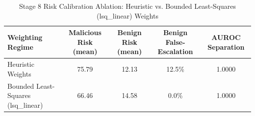 \begin{table}[t]
\centering
\caption{Stage 8 Risk Calibration Ablation: Heuristic vs. Bounded Least-Squares (lsq\_linear) Weights}
\label{tab:risk_ablation}
\begin{tabular}{lcccc}
\toprule
Weighting Regime & Malicious Risk (mean) & Benign Risk (mean) & Benign False-Escalation & AUROC Separation \\ \midrule
Heuristic Weights & 75.79 & 12.13 & 12.5\% & 1.0000 \\
Bounded Least-Squares (lsq\_linear) & 66.46 & 14.58 & 0.0\% & 1.0000 \\
\bottomrule
\end{tabular}
\end{table}